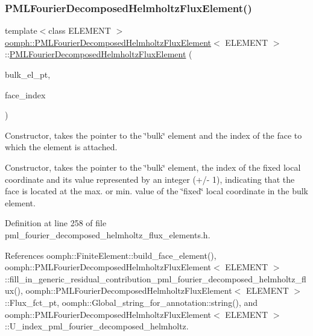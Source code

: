 \subsubsection{\texorpdfstring{P\+M\+L\+Fourier\+Decomposed\+Helmholtz\+Flux\+Element()}{PMLFourierDecomposedHelmholtzFluxElement()}\hspace{0.1cm}{\footnotesize\ttfamily [1/3]}}
{\footnotesize\ttfamily template$<$class E\+L\+E\+M\+E\+NT $>$ \\
\hyperlink{classoomph_1_1PMLFourierDecomposedHelmholtzFluxElement}{oomph\+::\+P\+M\+L\+Fourier\+Decomposed\+Helmholtz\+Flux\+Element}$<$ E\+L\+E\+M\+E\+NT $>$\+::\hyperlink{classoomph_1_1PMLFourierDecomposedHelmholtzFluxElement}{P\+M\+L\+Fourier\+Decomposed\+Helmholtz\+Flux\+Element} (\begin{DoxyParamCaption}\item[{\hyperlink{classoomph_1_1FiniteElement}{Finite\+Element} $\ast$const \&}]{bulk\+\_\+el\+\_\+pt,  }\item[{const int \&}]{face\+\_\+index }\end{DoxyParamCaption})}



Constructor, takes the pointer to the \char`\"{}bulk\char`\"{} element and the index of the face to which the element is attached. 

Constructor, takes the pointer to the \char`\"{}bulk\char`\"{} element, the index of the fixed local coordinate and its value represented by an integer (+/-\/ 1), indicating that the face is located at the max. or min. value of the \char`\"{}fixed\char`\"{} local coordinate in the bulk element. 

Definition at line 258 of file pml\+\_\+fourier\+\_\+decomposed\+\_\+helmholtz\+\_\+flux\+\_\+elements.\+h.



References oomph\+::\+Finite\+Element\+::build\+\_\+face\+\_\+element(), oomph\+::\+P\+M\+L\+Fourier\+Decomposed\+Helmholtz\+Flux\+Element$<$ E\+L\+E\+M\+E\+N\+T $>$\+::fill\+\_\+in\+\_\+generic\+\_\+residual\+\_\+contribution\+\_\+pml\+\_\+fourier\+\_\+decomposed\+\_\+helmholtz\+\_\+flux(), oomph\+::\+P\+M\+L\+Fourier\+Decomposed\+Helmholtz\+Flux\+Element$<$ E\+L\+E\+M\+E\+N\+T $>$\+::\+Flux\+\_\+fct\+\_\+pt, oomph\+::\+Global\+\_\+string\+\_\+for\+\_\+annotation\+::string(), and oomph\+::\+P\+M\+L\+Fourier\+Decomposed\+Helmholtz\+Flux\+Element$<$ E\+L\+E\+M\+E\+N\+T $>$\+::\+U\+\_\+index\+\_\+pml\+\_\+fourier\+\_\+decomposed\+\_\+helmholtz.

